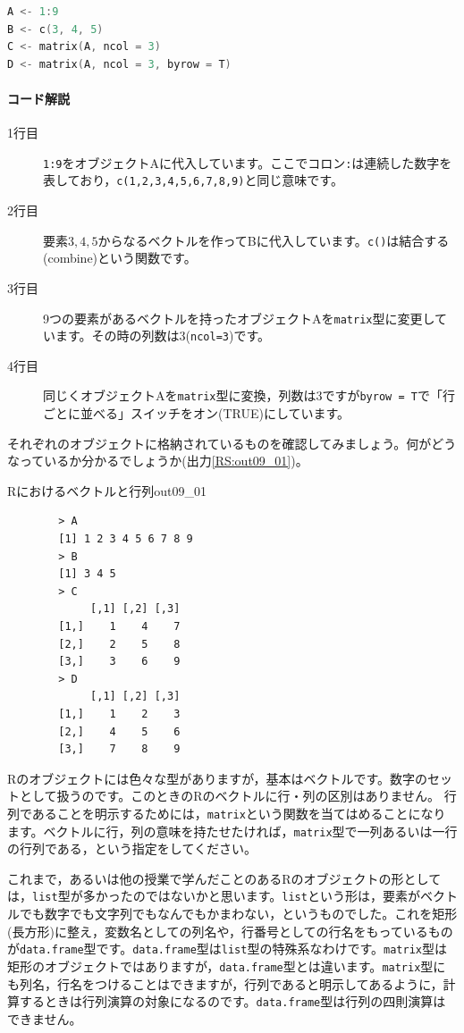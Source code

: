 \documentclass{ltjsbook}
\begin{document}
\begin{lstlisting}[language=c++,label={code::09_01},caption={ベクトルデータの保持}]
A <- 1:9
B <- c(3, 4, 5)
C <- matrix(A, ncol = 3)
D <- matrix(A, ncol = 3, byrow = T)
\end{lstlisting}

\paragraph{コード解説}
\begin{description}
    \item[1行目] \texttt{1:9}をオブジェクトAに代入しています。ここでコロン\verb|:|は連続した数字を表しており，\texttt{c(1,2,3,4,5,6,7,8,9)}と同じ意味です。
    \item[2行目] 要素$3,4,5$からなるベクトルを作ってBに代入しています。\texttt{c()}は結合する(combine)という関数です。
    \item[3行目] 9つの要素があるベクトルを持ったオブジェクトAを\texttt{matrix}型に変更しています。その時の列数は3(\texttt{ncol=3})です。
    \item[4行目] 同じくオブジェクトAを\texttt{matrix}型に変換，列数は3ですが\texttt{byrow = T}で「行ごとに並べる」スイッチをオン(TRUE)にしています。
\end{description}

それぞれのオブジェクトに格納されているものを確認してみましょう。何がどうなっているか分かるでしょうか(出力\ref{RS:out09_01})。

\begin{Rscreen}{Rにおけるベクトルと行列}{out09_01}
    \begin{verbatim}
        > A
        [1] 1 2 3 4 5 6 7 8 9
        > B
        [1] 3 4 5
        > C
             [,1] [,2] [,3]
        [1,]    1    4    7
        [2,]    2    5    8
        [3,]    3    6    9
        > D
             [,1] [,2] [,3]
        [1,]    1    2    3
        [2,]    4    5    6
        [3,]    7    8    9
    \end{verbatim}
\end{Rscreen}

Rのオブジェクトには色々な型がありますが，基本はベクトルです。数字のセットとして扱うのです。このときのRのベクトルに行・列の区別はありません。
行列であることを明示するためには，\texttt{matrix}という関数を当てはめることになります。ベクトルに行，列の意味を持たせたければ，\texttt{matrix}型で一列あるいは一行の行列である，という指定をしてください。

これまで，あるいは他の授業で学んだことのあるRのオブジェクトの形としては，\texttt{list}型が多かったのではないかと思います。\texttt{list}という形は，要素がベクトルでも数字でも文字列でもなんでもかまわない，というものでした。これを矩形(長方形)に整え，変数名としての列名や，行番号としての行名をもっているものが\texttt{data.frame}型です。\texttt{data.frame}型は\texttt{list}型の特殊系なわけです。\texttt{matrix}型は矩形のオブジェクトではありますが，\texttt{data.frame}型とは違います。\texttt{matrix}型にも列名，行名をつけることはできますが，行列であると明示してあるように，計算するときは行列演算の対象になるのです。\texttt{data.frame}型は行列の四則演算はできません。
\end{document}
